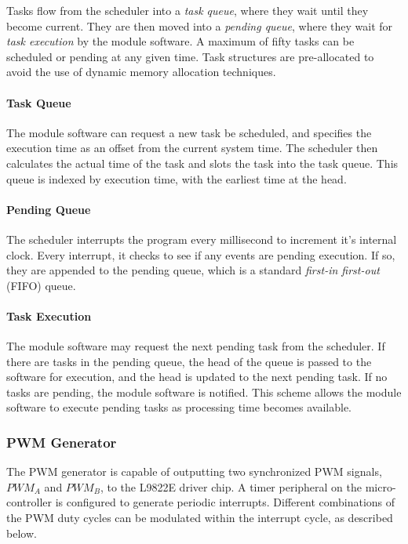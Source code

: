 Tasks flow from the scheduler into a \emph{task queue}, where they wait until they become current. They are then moved into a \emph{pending queue}, where they wait for \emph{task execution} by the module software. A maximum of fifty tasks can be scheduled or pending at any given time. Task structures are pre-allocated to avoid the use of dynamic memory allocation techniques.

\paragraph{Task Queue} The module software can request a new task be scheduled, and specifies the execution time as an offset from the current system time. The scheduler then calculates the actual time of the task and slots the task into the task queue. This queue is indexed by execution time, with the earliest time at the head.


\paragraph{Pending Queue}  The scheduler interrupts the program every millisecond to increment it's internal clock. Every interrupt, it checks to see if any events are pending execution. If so, they are appended to the pending queue, which is a standard \emph{first-in first-out} (FIFO) queue. 

\paragraph{Task Execution} The module software may request the next pending task from the scheduler. If there are tasks in the pending queue, the head of the queue is passed to the software for execution, and the head is updated to the next pending task. If no tasks are pending, the module software is notified. This scheme allows the module software to execute pending tasks as processing time becomes available.

\subsubsection{PWM Generator}

The PWM generator is capable of outputting two synchronized PWM signals, $PWM_A$ and $PWM_B$, to the L9822E driver chip. A timer peripheral on the micro-controller is configured to generate periodic interrupts. Different combinations of the PWM duty cycles can be modulated within the interrupt cycle, as described below.

